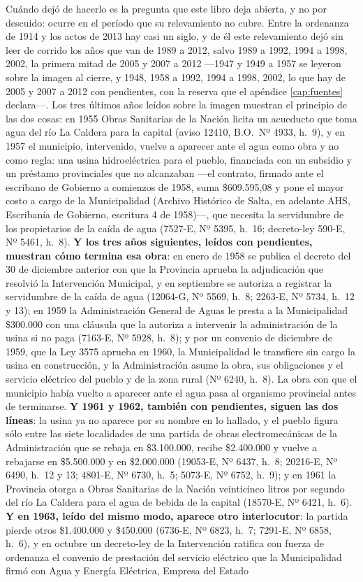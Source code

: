 Cuándo dejó de hacerlo es la pregunta que este libro deja abierta, y no por descuido: ocurre
en el período que su relevamiento no cubre. Entre la ordenanza de 1914 y los actos de 2013 hay casi un siglo, y de él este relevamiento dejó sin leer de corrido los años que van de 1989 a 2012, salvo 1989 a 1992, 1994 a 1998, 2002, la primera mitad de 2005 y 2007 a 2012 ---1947 y 1949 a 1957 se leyeron sobre la imagen al cierre, y 1948, 1958 a 1992, 1994 a 1998, 2002, lo que hay de 2005 y 2007 a 2012 con pendientes, con la reserva que el apéndice \ref{cap:fuentes} declara---. Los tres últimos años leídos sobre la imagen muestran el principio de las dos cosas: en 1955 Obras Sanitarias de la Nación licita un acueducto que toma agua del río La Caldera para la capital (aviso 12410, B.O.\ Nº 4933, h.\ 9), y en 1957 el municipio, intervenido, vuelve a aparecer ante el agua como obra y no como regla: una usina hidroeléctrica para el pueblo, financiada con un subsidio y un préstamo provinciales que no alcanzaban ---el contrato, firmado ante el escribano de Gobierno a comienzos de 1958, suma \$609.595,08 y pone el mayor costo a cargo de la Municipalidad (Archivo Histórico de Salta, en adelante AHS, Escribanía de Gobierno, escritura 4 de 1958)---, que necesita la servidumbre de los propietarios de la caída de agua (7527-E, Nº 5395, h.\ 16; decreto-ley 590-E, Nº 5461, h.\ 8). \textbf{Y los tres años siguientes, leídos con pendientes, muestran cómo termina esa obra}: en enero de 1958 se publica el decreto del 30 de diciembre anterior con que la Provincia aprueba la adjudicación que resolvió la Intervención Municipal, y en septiembre se autoriza a registrar la servidumbre de la caída de agua (12064-G, Nº 5569, h.\ 8; 2263-E, Nº 5734, h.\ 12 y 13); en 1959 la Administración General de Aguas le presta a la Municipalidad \$300.000 con una cláusula que la autoriza a intervenir la administración de la usina si no paga (7163-E, Nº 5928, h.\ 8); y por un convenio de diciembre de 1959, que la Ley 3575 aprueba en 1960, la Municipalidad le transfiere sin cargo la usina en construcción, y la Administración asume la obra, sus obligaciones y el servicio eléctrico del pueblo y de la zona rural (Nº 6240, h.\ 8). La obra con que el municipio había vuelto a aparecer ante el agua pasa al organismo provincial antes de terminarse. \textbf{Y 1961 y 1962, también con pendientes, siguen las dos líneas}: la usina ya no aparece por su nombre en lo hallado, y el pueblo figura sólo entre las siete localidades de una partida de obras electromecánicas de la Administración que se rebaja en \$3.100.000, recibe \$2.400.000 y vuelve a rebajarse en \$5.500.000 y en \$2.000.000 (19053-E, Nº 6437, h.\ 8; 20216-E, Nº 6490, h.\ 12 y 13; 4801-E, Nº 6730, h.\ 5; 5073-E, Nº 6752, h.\ 9); y en 1961 la Provincia otorga a Obras Sanitarias de la Nación veinticinco litros por segundo del río La Caldera para el agua de bebida de la capital (18570-E, Nº 6421, h.\ 6). \textbf{Y en 1963, leído del mismo modo, aparece otro interlocutor}: la partida pierde otros \$1.400.000 y \$450.000 (6736-E, Nº 6823, h.\ 7; 7291-E, Nº 6858, h.\ 6), y en octubre un decreto-ley de la Intervención ratifica con fuerza de ordenanza el convenio de prestación del servicio eléctrico que la Municipalidad firmó con Agua y Energía Eléctrica, Empresa del Estado 